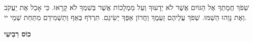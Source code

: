 \vspace{1em}


שְׁפֹךְ חֲמָתְךָ אֶל הַגּוֹיִם אֲשֶׁר לֹא יְדָעוּךָ וְעַל מַמְלָכוֹת אֲשֶׁר בְּשִׁמְךָ לֹא קָרָאוּ. כִּי אָכַל אֶת יַעֲקֹב וְאֶת נָוֵהוּ הֵשַׁמּוּ. שְׁפֹךְ עֲלֵיהֶם זַעְמֶךָ וַחֲרוֹן אַפְּךָ יַשִׂיגֵם. תִּרְדֹּף בְּאַף וְתַשְׁמִידֵם מִתַּחַת שְׁמֵי יי.

\break


\begin{center}
{\large \bfseries \textcolor{light-gray}{
כוֹס רִבִיעִי
}}
\end{center}


\vspace{1em}

